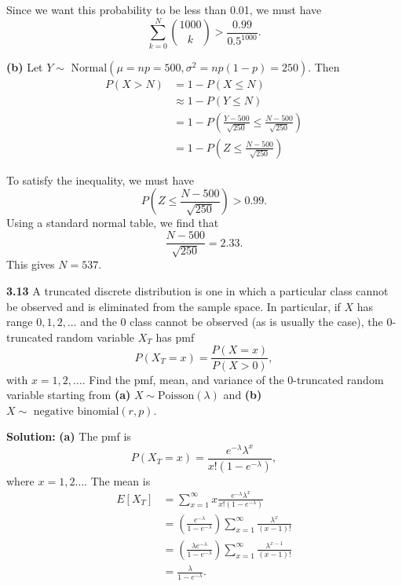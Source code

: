\documentclass{article}
\newcommand{\mybox}{%
    \collectbox{%
        \setlength{\fboxsep}{1pt}%
        \fbox{\BOXCONTENT}%
    }%
}
\begin{document}
\noindent Since we want this probability to be less than 0.01, we must have $$\sum\limits_{k=0}^N{1000 \choose k} > \frac{0.99}{0.5^{1000}}.$$

\vspace{3mm}

\noindent\textbf{(b)}  Let $Y \sim \text{ Normal}(\mu = np = 500, \sigma^2 = np(1-p) = 250)$.  Then 
\begin{align}
P(X>N) &= 1 - P(X\leq N) \\
&\approx 1 - P(Y \leq N) \\
&= 1 - P\left(\frac{Y - 500}{\sqrt{250}} \leq \frac{N-500}{\sqrt{250}}\right) \\
&= 1 - P\left(Z \leq \frac{N - 500}{\sqrt{250}}\right)
\end{align}

\noindent To satisfy the inequality, we must have $$P\left(Z \leq \frac{N - 500}{\sqrt{250}}\right) > 0.99.$$  Using a standard normal table, we find that $$\frac{N- 500}{\sqrt{250}} = 2.33.$$ This gives $N = 537$.  

\pagebreak

\noindent\mybox{\textbf{3.13}}  A truncated discrete distribution is one in which a particular class cannot be observed and is eliminated from the sample space.  In particular, if $X$ has range $0, 1, 2, \ldots$ and the $0$ class cannot be observed (as is usually the case), the $0$-truncated random variable $X_T$ has pmf $$P(X_T = x) = \frac{P(X=x)}{P(X>0)},$$ with $x = 1, 2, \ldots$.  Find the pmf, mean, and variance of the 0-truncated random variable starting from \textbf{(a)}  $X \sim \text{Poisson}(\lambda)$ and \textbf{(b)} $X \sim \text{ negative binomial}(r,p)$.  

\vspace{3mm}

\noindent\mybox{\textbf{Solution:}}  \textbf{(a)}  The pmf is $$P(X_T = x) = \frac{e^{-\lambda}\lambda^x}{x!(1-e^{-\lambda})},$$ where $x = 1, 2 \ldots$.  The mean is 
\begin{align}
E[X_T] &= \sum\limits_{x = 1}^{\infty} x\frac{e^{-\lambda}\lambda^x}{x!(1-e^{-\lambda})} \\
&= \left(\frac{e^{-\lambda}}{1-e^{-\lambda}}\right)\sum\limits_{x = 1}^{\infty} \frac{\lambda^x}{(x-1)!} \\
&= \left(\frac{\lambda e^{-\lambda}}{1-e^{-\lambda}}\right)\sum\limits_{x = 1}^{\infty} \frac{\lambda^{x-1}}
{(x-1)!} \\ 
&= \frac{\lambda}{1-e^{-\lambda}}.
\end{align}
\end{document}

